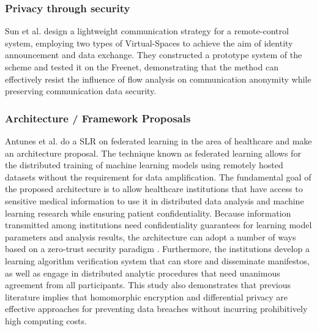 \subsubsection{Privacy through security}

Sun et al. \cite{SunSecure} design a lightweight communication strategy
for a remote-control system, employing two types of Virtual-Spaces to achieve
the aim of identity announcement and data exchange. They constructed a prototype
system of the scheme and tested it on the Freenet, demonstrating that the
method can effectively resist the influence of flow analysis on communication
anonymity while preserving communication data security.

\subsubsection{Architecture / Framework Proposals}

Antunes et al. \cite{AntunesFederated} do a SLR on federated learning in
the area of healthcare and make an architecture proposal. The technique
known as federated learning allows for the distributed training of machine
learning models using remotely hosted datasets without the requirement for
data amplification. The fundamental goal of the proposed architecture is
to allow healthcare institutions that have access to sensitive medical information
to use it in distributed data analysis and machine learning research while
ensuring patient confidentiality. Because information transmitted among
institutions need confidentiality guarantees for learning model parameters
and analysis results, the architecture can adopt a number of ways based on
a zero-trust security paradigm \cite{ChenSecurity}. Furthermore, the institutions
develop a learning algorithm verification system that can store and disseminate
manifestos, as well as engage in distributed analytic procedures that need
unanimous agreement from all participants. This study also demonstrates
that previous literature implies that homomorphic encryption and differential
privacy are effective approaches for preventing data breaches without incurring
prohibitively high computing costs.


